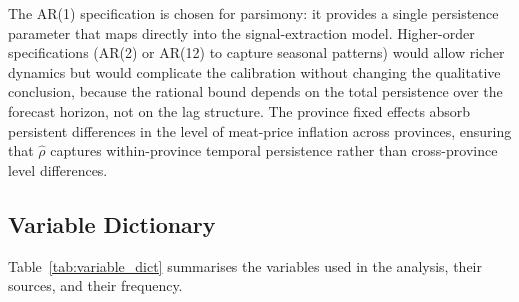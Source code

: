 The AR(1) specification is chosen for parsimony: it provides
a single persistence parameter that maps directly into the
signal-extraction model.
Higher-order specifications (AR(2) or AR(12) to capture
seasonal patterns) would allow richer dynamics but would
complicate the calibration without changing the qualitative
conclusion, because the rational bound depends on the total
persistence over the forecast horizon, not on the lag
structure.
The province fixed effects absorb persistent differences in
the level of meat-price inflation across provinces, ensuring
that $\hat{\rho}$ captures within-province temporal
persistence rather than cross-province level differences.

\subsection{Variable Dictionary}

Table~\ref{tab:variable_dict} summarises the variables used
in the analysis, their sources, and their frequency.



